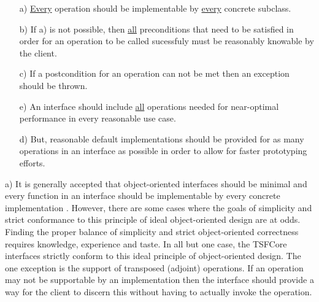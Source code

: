 \begin{enumerate}

{}\item[a)] {}\underline{Every} operation should be implementable by
{}\underline{every} concrete subclass.

{}\item[b)] If a) is not possible, then {}\underline{all} preconditions
that need to be satisfied in order for an operation to be called
sucessfuly must be reasonably knowable by the client.

{}\item[c)] If a postcondition for an operation can not be met then
an exception should be thrown.

{}\item[e)] An interface should include {}\underline{all} operations
needed for near-optimal performance in every reasonable use case.

{}\item[d)] But, reasonable default implementations should be provided
for as many operations in an interface as possible in order to allow
for faster prototyping efforts.

\end{enumerate}

a) It is generally accepted that object-oriented interfaces should be
minimal and every function in an interface should be implementable by
every concrete implementation {}\cite[Section
24.4.3]{ref:stroustrup_1997}.  However, there are some cases where the
goals of simplicity and strict conformance to this principle of ideal
object-oriented design are at odds.  Finding the proper balance of
simplicity and strict object-oriented correctness requires knowledge,
experience and taste.  In all but one case, the TSFCore interfaces
strictly conform to this ideal principle of object-oriented design.
The one exception is the support of transposed (adjoint) operations.
If an operation may not be supportable by an implementation then the
interface should provide a way for the client to discern this without
having to actually invoke the operation.



